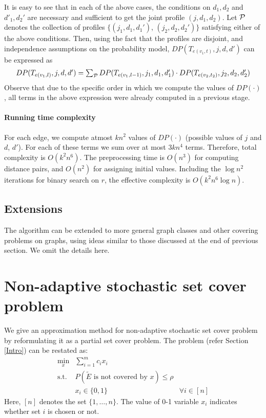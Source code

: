 \documentclass[11pt,onecolumn]{article}
\begin{document}
It is easy to see that in each of the above cases, the conditions on $d_1,d_2$ and $d'_1, d_2'$ are necessary and sufficient to get the joint profile $(j,d_1,d_2)$. Let $\cal P$ denotes the collection of profiles $\{(j_1,d_1,d_1')$, $(j_2,d_2,d_2')\}$ satisfying either of the above conditions. 
Then, using the fact that the profiles are disjoint, and independence assumptions on the probability model, $DP(T_{e(v_1,t)}, j, d, d')$  can be expressed as
$$
\begin{array}{l} 
DP(T_{e(v_1,l)}, j, d, d') = \sum_{\cal P} DP(T_{e(v_1,l-1)}, j_1, d_1, d_1') \cdot DP(T_{e(v_2,t_2)}, j_2, d_2, d_2')
\end{array}
$$
Observe that due to the specific order in which we compute the values of $DP(\cdot)$, all terms in the above expression were already computed in a previous stage. 

\paragraph{Running time complexity}
For each edge, we compute atmost $kn^2$ values of $DP(\cdot)$ (possible values of $j$ and $d$, $d'$). For each of these 
terms we sum over at most $3kn^4$ terms. Therefore, total complexity is $O(k^2n^6)$. The preprocessing time is $O(n^3)$ for computing distance pairs, and $O(n^2)$ for assigning initial values. Including the $\log n^2$ iterations for binary search on $r$, the effective complexity is $O(k^2n^6\log{n})$. 


\subsection{Extensions}
The algorithm can be extended to more general graph classes and other covering problems on graphs, using ideas similar to those discussed at the end of previous section. We omit the details here.
\section{Non-adaptive stochastic set cover problem}
We give an approximation method for non-adaptive stochastic set cover problem by reformulating it as a partial set cover problem. The problem (refer Section \ref{Intro}) can be restated as:
\begin{eqnarray*}
\label{set-cover-1-stage}
\min_{x} & \sum_{i=1}^m c_ix_i & \nonumber\\
\textrm{s.t. } & P(\tilde{E} \textrm{ is not covered by } x) \le \rho & \nonumber\\
	& x_i \in \{0,1\} & \forall i \in [n]
\end{eqnarray*}
 Here, $[n]$ denotes the set $\{1, \ldots, n\}$. The value of 0-1 variable $x_i$ indicates whether set $i$ is chosen or not. 
\end{document}
